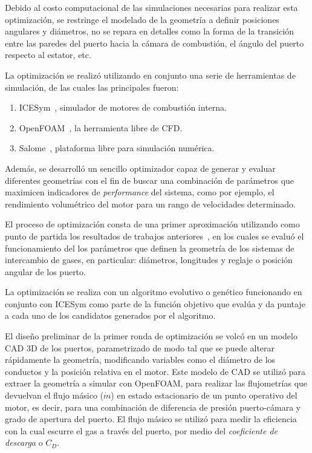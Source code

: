 Debido al costo computacional de las simulaciones necesarias para realizar esta
optimización, se restringe el modelado de la geometría a definir posiciones
angulares y diámetros, no se repara en detalles como la forma de la transición
entre las paredes del puerto hacia la cámara de combustión, el ángulo del puerto
respecto al estator, etc.

La optimización se realizó utilizando en conjunto una serie de herramientas de
simulación, de las cuales las principales fueron:

\begin{enumerate}
    \item ICESym~\parencite{icesym}, simulador de motores de combustión interna.
    \item OpenFOAM~\parencite{openfoam}, la herramienta libre de CFD.
    \item Salome~\parencite{salome}, plataforma libre para simulación numérica.
\end{enumerate}


Además, se desarrolló un sencillo optimizador capaz de generar y evaluar
diferentes geometrías con el fin de buscar una combinación de parámetros que
maximicen indicadores de \emph{performance} del sistema, como por ejemplo, el
rendimiento volumétrico del motor para un rango de velocidades determinado.

El proceso de optimización consta de una primer aproximación utilizando como
punto de partida los resultados de trabajos anteriores~\parencite{lopez13}, en
los cuales se evaluó el funcionamiento del los parámetros que definen la
geometría de los sistemas de intercambio de gases, en particular: diámetros,
longitudes y reglaje o posición angular de los puerto.

La optimización se realiza con un algoritmo evolutivo o genético funcionando en
conjunto con ICESym como parte de la función objetivo que evalúa y da puntaje a
cada uno de los candidatos generados por el algoritmo.

El diseño preliminar de la primer ronda de optimización se volcó en un modelo
CAD 3D de los puertos, parametrizado de modo tal que se puede alterar
rápidamente la geometría, modificando variables como el diámetro de los
conductos y la posición relativa en el motor.
%
Este modelo de CAD se utilizó para extraer la geometría a simular con OpenFOAM,
para realizar las flujometrías que devuelvan el flujo másico ($\dot{m}$) en
estado estacionario de un punto operativo del motor, es decir, para una
combinación de diferencia de presión puerto-cámara y grado de apertura del
puerto.
%
El flujo másico se utilizó para medir la eficiencia con la cual escurre el gas
a través del puerto, por medio del \emph{coeficiente de descarga} o $C_D$.

